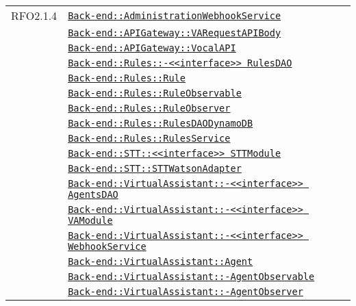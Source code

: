 \begin{longtable}{|>{\centering}m{3cm}|m{10cm}<{\centering}|}
RFO2.1.4 & \hyperref[Back-end::AdministrationWebhookService]{\texttt{Back-end::AdministrationWebhookService}}\\
& \hyperref[Back-end::APIGateway::VARequestAPIBody]{\texttt{Back-end::APIGateway::VARequestAPIBody}}\\
& \hyperref[Back-end::APIGateway::VocalAPI]{\texttt{Back-end::APIGateway::VocalAPI}}\\
& \hyperref[Back-end::Rules::<<interface>> RulesDAO]{\texttt{Back-end::Rules::-\linebreak <<interface>> RulesDAO}}\\
& \hyperref[Back-end::Rules::Rule]{\texttt{Back-end::Rules::Rule}}\\
& \hyperref[Back-end::Rules::RuleObservable]{\texttt{Back-end::Rules::RuleObservable}}\\
& \hyperref[Back-end::Rules::RuleObserver]{\texttt{Back-end::Rules::RuleObserver}}\\
& \hyperref[Back-end::Rules::RulesDAODynamoDB]{\texttt{Back-end::Rules::RulesDAODynamoDB}}\\
& \hyperref[Back-end::Rules::RulesService]{\texttt{Back-end::Rules::RulesService}}\\
& \hyperref[Back-end::STT::<<interface>> STTModule]{\texttt{Back-end::STT::<<interface>> STTModule}}\\
& \hyperref[Back-end::STT::STTWatsonAdapter]{\texttt{Back-end::STT::STTWatsonAdapter}}\\
& \hyperref[Back-end::VirtualAssistant::<<interface>> AgentsDAO]{\texttt{Back-end::VirtualAssistant::-\linebreak <<interface>> AgentsDAO}}\\
& \hyperref[Back-end::VirtualAssistant::<<interface>> VAModule]{\texttt{Back-end::VirtualAssistant::-\linebreak <<interface>> VAModule}}\\
& \hyperref[Back-end::VirtualAssistant::<<interface>> WebhookService]{\texttt{Back-end::VirtualAssistant::-\linebreak <<interface>> WebhookService}}\\
& \hyperref[Back-end::VirtualAssistant::Agent]{\texttt{Back-end::VirtualAssistant::Agent}}\\
& \hyperref[Back-end::VirtualAssistant::AgentObservable]{\texttt{Back-end::VirtualAssistant::-\linebreak AgentObservable}}\\
& \hyperref[Back-end::VirtualAssistant::AgentObserver]{\texttt{Back-end::VirtualAssistant::-\linebreak AgentObserver}}\\

\end{longtable}
